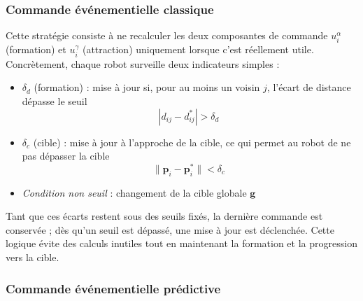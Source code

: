 \subsubsection{Commande événementielle classique}
Cette stratégie consiste à ne recalculer les deux composantes de commande $u_i^\alpha$ (formation) et $u_i^\gamma$ (attraction) uniquement lorsque c’est réellement utile. Concrètement, chaque robot surveille deux indicateurs simples : 
\begin{itemize}
    \item $\delta_d$ (formation) : mise à jour si, pour au moins un voisin $j$, l’écart de distance dépasse le seuil
    \[
        |d_{ij}-d_{ij}^*|>\delta_d \;
    \]
    \item $\delta_c$ (cible) : mise à jour à l’approche de la cible, ce qui permet au robot de ne pas dépasser la cible
    \[
        \|\mathbf{p}_i-\mathbf{p}_i^*\|<\delta_c \;
    \]
    \item \textit{Condition non seuil} : changement de la cible globale $\mathbf{g}$ \;
\end{itemize}
Tant que ces écarts restent sous des seuils fixés, la dernière commande est conservée ; dès qu’un seuil est dépassé, une mise à jour est déclenchée. Cette logique évite des calculs inutiles tout en maintenant la formation et la progression vers la cible. 

\subsubsection{Commande événementielle prédictive}

